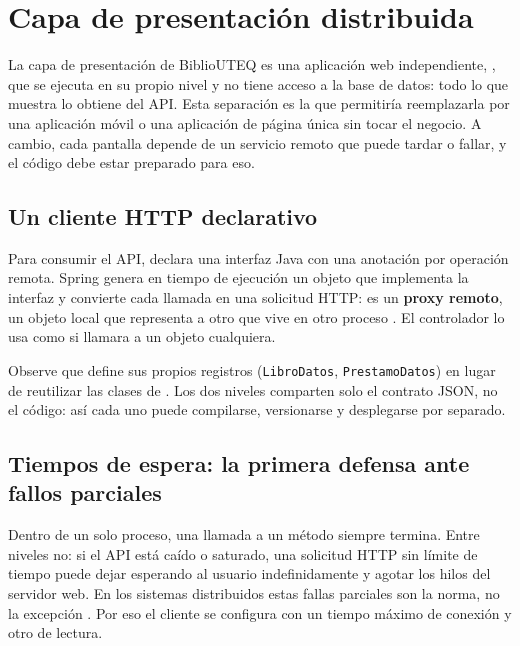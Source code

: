 \chapter{Capa de presentación distribuida}\label{cap:presentacion}

La capa de presentación de BiblioUTEQ es una aplicación web independiente, , que se ejecuta en su propio nivel y no tiene acceso a la base de datos: todo lo que muestra lo obtiene del API. Esta separación es la que permitiría reemplazarla por una aplicación móvil o una aplicación de página única sin tocar el negocio. A cambio, cada pantalla depende de un servicio remoto que puede tardar o fallar, y el código debe estar preparado para eso.

\section{Un cliente HTTP declarativo}

Para consumir el API,  declara una interfaz Java con una anotación por operación remota. Spring genera en tiempo de ejecución un objeto que implementa la interfaz y convierte cada llamada en una solicitud HTTP: es un \textbf{proxy remoto}, un objeto local que representa a otro que vive en otro proceso \cite{gamma1994design}. El controlador lo usa como si llamara a un objeto cualquiera.



Observe que  define sus propios registros (\texttt{LibroDatos}, \texttt{PrestamoDatos}) en lugar de reutilizar las clases de . Los dos niveles comparten solo el contrato JSON, no el código: así cada uno puede compilarse, versionarse y desplegarse por separado.

\section{Tiempos de espera: la primera defensa ante fallos parciales}

Dentro de un solo proceso, una llamada a un método siempre termina. Entre niveles no: si el API está caído o saturado, una solicitud HTTP sin límite de tiempo puede dejar esperando al usuario indefinidamente y agotar los hilos del servidor web. En los sistemas distribuidos estas fallas parciales son la norma, no la excepción \cite{vansteen2023distributed}. Por eso el cliente se configura con un tiempo máximo de conexión y otro de lectura.

